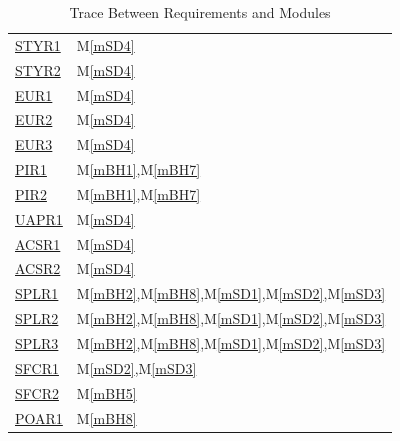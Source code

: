\documentclass[12pt, titlepage]{article}
\newcommand{\mref}[1]{M\ref{#1}}
\begin{document}
\begin{table}[H]
\begin{tabular}{p{} p{}}
  \href{../../SRS/SRS.pdf#STYROne}{ STYR1 } & \mref{mSD4}\\
  \href{../../SRS/SRS.pdf#STYRTwo}{ STYR2 } & \mref{mSD4}\\
  \href{../../SRS/SRS.pdf#EUROne}{ EUR1 } & \mref{mSD4}\\
  \href{../../SRS/SRS.pdf#EURTwo}{ EUR2 } & \mref{mSD4}\\
  \href{../../SRS/SRS.pdf#EurThree}{ EUR3 } & \mref{mSD4}\\
  \href{../../SRS/SRS.pdf#PIROne}{ PIR1 } & \mref{mBH1},\mref{mBH7}\\
  \href{../../SRS/SRS.pdf#PIRTwo}{ PIR2 } & \mref{mBH1},\mref{mBH7}\\
  \href{../../SRS/SRS.pdf#UAPROne}{ UAPR1 } & \mref{mSD4}\\
  \href{../../SRS/SRS.pdf#ACSROne}{ ACSR1 } & \mref{mSD4}\\
  \href{../../SRS/SRS.pdf#ACSRTwo}{ ACSR2 } & \mref{mSD4}\\
  \href{../../SRS/SRS.pdf#SPLROne}{ SPLR1 } & \mref{mBH2},\mref{mBH8},\mref{mSD1},\mref{mSD2},\mref{mSD3}\\
  \href{../../SRS/SRS.pdf#SPLRTwo}{ SPLR2 } & \mref{mBH2},\mref{mBH8},\mref{mSD1},\mref{mSD2},\mref{mSD3}\\
  \href{../../SRS/SRS.pdf#SPLRThree}{ SPLR3 } & \mref{mBH2},\mref{mBH8},\mref{mSD1},\mref{mSD2},\mref{mSD3}\\
  \href{../../SRS/SRS.pdf#SFCROne}{ SFCR1 } & \mref{mSD2},\mref{mSD3}\\
  \href{../../SRS/SRS.pdf#SFCRTwo}{ SFCR2 } & \mref{mBH5}\\
  \href{../../SRS/SRS.pdf#POAROne}{ POAR1 } & \mref{mBH8}\\
\bottomrule
\end{tabular}
\caption{Trace Between Requirements and Modules}
\end{table}

\newpage
\end{document}
